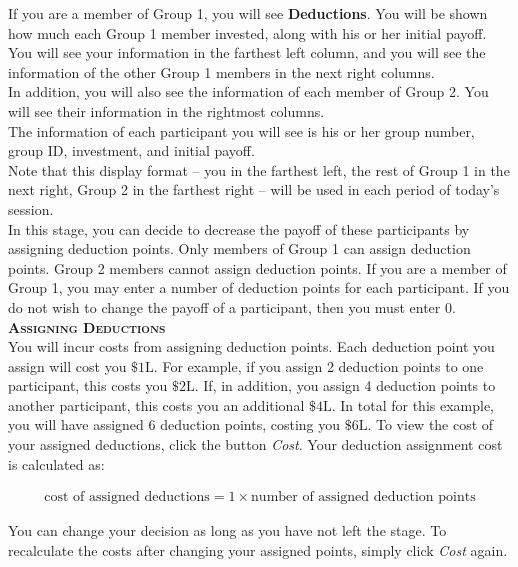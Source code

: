 \documentclass[12pt]{article}
\begin{document}
If you are a member of Group 1, you will see {\bf Deductions}. You will be shown how much each Group 1 member invested, along with his or her initial payoff. You will see your information in the farthest left column, and you will see the information of the other Group 1 members in the next right columns.\\

In addition, you will also see the information of each member of Group 2. You will see their information in the rightmost columns.\\

The information of each participant you will see is his or her group number, group ID, investment, and initial payoff.\\

Note that this display format -- you in the farthest left, the rest of Group 1 in the next right, Group 2 in the farthest right -- will be used in each period of today's session.\\

In this stage, you can decide to decrease the payoff of these participants by assigning deduction points. Only members of Group 1 can assign deduction points.  Group 2 members cannot assign deduction points. 
If you are a member of Group 1, you may enter a number of deduction points for each participant. If you do not wish to change the payoff of a participant, then you must enter 0.\\ 

{\bf \scshape Assigning Deductions}\\

You will incur costs from assigning deduction points. Each deduction point you assign will cost you $\$1\text{L}$. For example, if you assign 2 deduction points to one participant, this costs you $\$2\text{L}$. If, in addition, you assign 4 deduction points to another participant, this costs you an additional $\$4\text{L}$. In total for this example, you will have assigned 6 deduction points, costing you $\$6\text{L}$.  To view the cost of your assigned deductions, click the button {\em Cost}. Your deduction assignment cost is calculated as: 

\begin{align*}
\text{cost of assigned deductions} = 1 \times \text{number of assigned deduction points}
\end{align*}

You can change your decision as long as you have not left the stage. To recalculate the costs after changing your assigned points, simply click {\em Cost} again.\\
\end{document}
